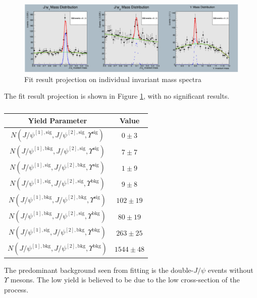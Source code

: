 \documentclass[10pt,twocolumn]{article}
\begin{document}
\begin{figure}[!htbp]
    \centering
    \includegraphics[width=1.0\linewidth]{images/JpsiJpsiY_fit.png}
    \caption{Fit result projection on individual invariant mass spectra}
    \label{fig:JpsiJpsiY_fit}
\end{figure}

The fit result projection is shown in Figure  \ref{fig:JpsiJpsiY_fit}, with no significant results.

\begin{table}[h!]
    \centering
    \caption{}
    \begin{tabular}{cc}
        \toprule
        \textbf{Yield Parameter} & \textbf{Value} \\
        \midrule
        $N(J/\psi^{[1], \text{sig} },J/\psi^{[2],\text{sig} }, \Upsilon^\text{sig})$ & $0 \pm 3$ \\
        $N(J/\psi^{[1], \text{bkg} },J/\psi^{[2],\text{sig} }, \Upsilon^\text{sig})$ & $7 \pm 7$ \\
        $N(J/\psi^{[1], \text{sig} },J/\psi^{[2],\text{bkg} }, \Upsilon^\text{sig})$ & $1 \pm 9$ \\
        $N(J/\psi^{[1], \text{sig} },J/\psi^{[2],\text{sig} }, \Upsilon^\text{bkg})$ & $9 \pm 8$ \\
        $N(J/\psi^{[1], \text{bkg} },J/\psi^{[2],\text{bkg} }, \Upsilon^\text{sig})$ & $102 \pm 19$ \\
        $N(J/\psi^{[1], \text{bkg} },J/\psi^{[2],\text{sig} }, \Upsilon^\text{bkg})$ & $80 \pm 19$ \\
        $N(J/\psi^{[1], \text{sig} },J/\psi^{[2],\text{bkg} }, \Upsilon^\text{bkg})$ & $263 \pm 25$ \\
        $N(J/\psi^{[1], \text{bkg} },J/\psi^{[2],\text{bkg} }, \Upsilon^\text{bkg})$ & $1544 \pm 48$ \\
        \bottomrule
    \end{tabular}
    \label{tab:my_label}
\end{table}

The predominant background seen from fitting is the double-$J/\psi$ events without $\Upsilon$ mesons. The low yield is believed to be due to the low cross-section of the process.
\end{document}
